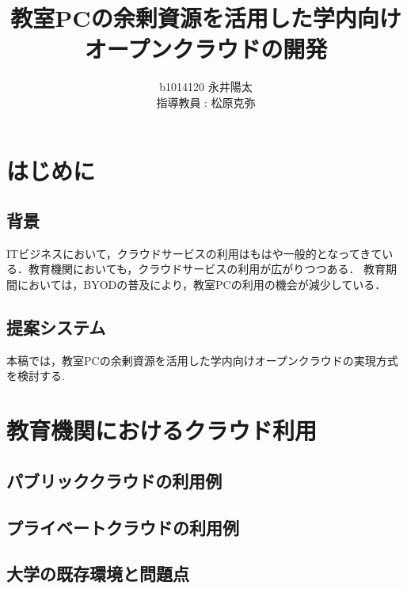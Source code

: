 ﻿%
%
%
\author{%
b1014120 永井陽太\\指導教員 : 松原克弥
}

\title{教室PCの余剰資源を活用した学内向けオープンクラウドの開発}

\maketitle

\section{はじめに}
\subsection{背景}
ITビジネスにおいて，クラウドサービスの利用はもはや一般的となってきている．教育機関においても，クラウドサービスの利用が広がりつつある．
教育期間においては，BYODの普及により，教室PCの利用の機会が減少している．
\subsection{提案システム}
本稿では，教室PCの余剰資源を活用した学内向けオープンクラウドの実現方式を検討する.

\section{教育機関におけるクラウド利用}

\subsection{パブリッククラウドの利用例}
\subsection{プライベートクラウドの利用例}
\subsection{大学の既存環境と問題点}

